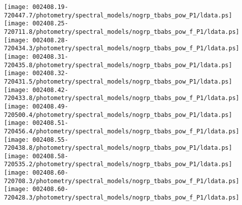 \documentclass{aastex}
\begin{document}
\begin{figure*}[!ht]
\centering
\texttt{[image: 002408.19-720447.7/photometry/spectral\_models/nogrp\_tbabs\_pow\_P1/ldata.ps]} \hfill 
\texttt{[image: 002408.25-720711.8/photometry/spectral\_models/nogrp\_tbabs\_pow\_f\_P1/ldata.ps]} \hfill 
\texttt{[image: 002408.28-720434.3/photometry/spectral\_models/nogrp\_tbabs\_pow\_f\_P1/ldata.ps]} \\ 
\vspace*{0.5in}
\texttt{[image: 002408.31-720435.8/photometry/spectral\_models/nogrp\_tbabs\_pow\_P1/ldata.ps]} \hfill 
\texttt{[image: 002408.32-720431.5/photometry/spectral\_models/nogrp\_tbabs\_pow\_P1/ldata.ps]} \hfill 
\texttt{[image: 002408.42-720433.8/photometry/spectral\_models/nogrp\_tbabs\_pow\_f\_P1/ldata.ps]} \\ 
\vspace*{0.5in}
\texttt{[image: 002408.49-720500.4/photometry/spectral\_models/nogrp\_tbabs\_pow\_P1/ldata.ps]} \hfill 
\texttt{[image: 002408.51-720456.4/photometry/spectral\_models/nogrp\_tbabs\_pow\_f\_P1/ldata.ps]} \hfill 
\texttt{[image: 002408.55-720438.8/photometry/spectral\_models/nogrp\_tbabs\_pow\_P1/ldata.ps]} \\ 
\vspace*{0.5in}
\texttt{[image: 002408.58-720535.2/photometry/spectral\_models/nogrp\_tbabs\_pow\_P1/ldata.ps]} \hfill 
\texttt{[image: 002408.60-720708.3/photometry/spectral\_models/nogrp\_tbabs\_pow\_f\_P1/ldata.ps]} \hfill 
\texttt{[image: 002408.60-720428.3/photometry/spectral\_models/nogrp\_tbabs\_pow\_f\_P1/ldata.ps]} \\ 
\vspace*{0.5in}
\end{figure*}
\clearpage
\end{document}
